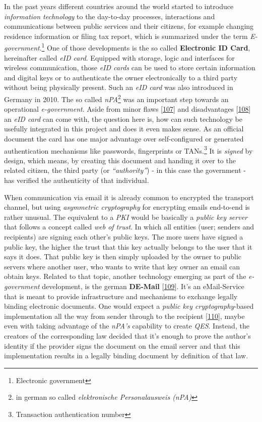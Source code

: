 \documentclass[12pt,english,a4paper,titlepage,cleardoublepage=empty,dottedtoc]{report}
\begin{document}
In the past years different countries around the world started to
introduce \emph{information technology} to the day-to-day processes,
interactions and communications between public services and their
citizens, for example changing residence information or filing tax
report, which is summarized under the term
\emph{E-government}.\footnote{Electronic government} One of those
developments is the so called \textbf{Electronic ID Card}, hereinafter
called \emph{eID card}. Equipped with storage, logic and interfaces for
wireless communication, those \emph{eID cards} can be used to store
certain information and digital keys or to authenticate the owner
electronically to a third party without being physically present. Such
an \emph{eID card} was also introduced in Germany in 2010. The so called
\emph{nPA}\footnote{in german so called \emph{elektronische
  Personalausweis (nPA)}} was an important step towards an operational
\emph{e-government}. Aside from minor flaws
{[}\protect\hyperlink{ref-web_2013_npa-sicherheitsdefizit}{107}{]} and
disadvantages
{[}\protect\hyperlink{ref-web_2014_test-qes-support-in-npa}{108}{]} an
\emph{eID card} can come with, the question here is, how can such
technology be usefully integrated in this project and does it even makes
sense. As an official document the card has one major advantage over
self-configured or generated authentication mechanisms like passwords,
fingerprints or TANs.\footnote{Transaction authentication number} It is
\emph{signed} by design, which means, by creating this document and
handing it over to the related citizen, the third party (or
\emph{``authority''}) - in this case the government - has verified the
authenticity of that individual.

When communication via email it is already common to encrypted the
transport channel, but using \emph{asymmetric cryptography} for
encrypting emails end-to-end is rather unusual. The equivalent to a
\emph{PKI} would be basically a \emph{public key server} that follows a
concept called \emph{web of trust}. In which all entities (user; senders
and recipients) are signing each other's public keys. The more users
have signed a public key, the higher the trust that this key actually
belongs to the user that it says it does. That public key is then simply
uploaded by the owner to public servers where another user, who wants to
write that key owner an email can obtain keys. Related to that topic,
another technology emerging as part of the \emph{e-government}
development, is the german \textbf{DE-Mail}
{[}\protect\hyperlink{ref-web_2017_about-de-mail}{109}{]}. It's an
eMail-Service that is meant to provide infrastructure and mechanisms to
exchange legally binding electronic documents. One would expect a
\emph{public key cryptography}-based implementation all the way from
sender through to the recipient
{[}\protect\hyperlink{ref-statement_2013_de-mail}{110}{]}, maybe even
with taking advantage of the \emph{nPA's} capability to create
\emph{QES}. Instead, the creators of the corresponding law decided that
it's enough to prove the author's identity if the provider signs the
document on the email server and that this implementation results in a
legally binding document by definition of that law.
\end{document}
